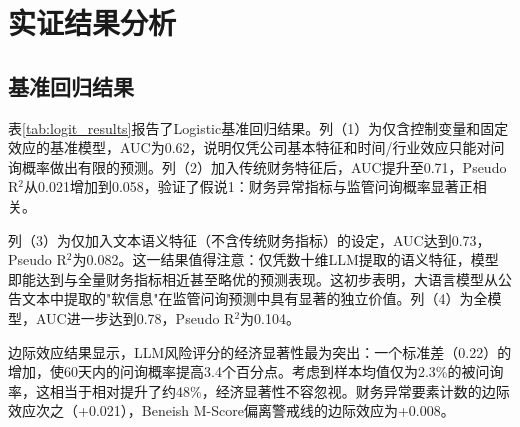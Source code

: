 
\section{实证结果分析}

\subsection{基准回归结果}

表\ref{tab:logit_results}报告了Logistic基准回归结果。列（1）为仅含控制变量和固定效应的基准模型，AUC为0.62，说明仅凭公司基本特征和时间/行业效应只能对问询概率做出有限的预测。列（2）加入传统财务特征后，AUC提升至0.71，Pseudo R$^2$从0.021增加到0.058，验证了假说1：财务异常指标与监管问询概率显著正相关。

列（3）为仅加入文本语义特征（不含传统财务指标）的设定，AUC达到0.73，Pseudo R$^2$为0.082。这一结果值得注意：仅凭数十维LLM提取的语义特征，模型即能达到与全量财务指标相近甚至略优的预测表现。这初步表明，大语言模型从公告文本中提取的"软信息"在监管问询预测中具有显著的独立价值。列（4）为全模型，AUC进一步达到0.78，Pseudo R$^2$为0.104。

边际效应结果显示，LLM风险评分的经济显著性最为突出：一个标准差（0.22）的增加，使60天内的问询概率提高3.4个百分点。考虑到样本均值仅为2.3\%的被问询率，这相当于相对提升了约48\%，经济显著性不容忽视。财务异常要素计数的边际效应次之（+0.021），Beneish M-Score偏离警戒线的边际效应为+0.008。

